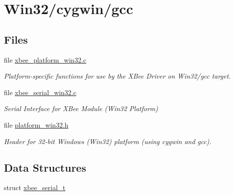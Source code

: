 \hypertarget{group__hal__win32}{\section{Win32/cygwin/gcc}
\label{group__hal__win32}
}
\subsection*{Files}
\begin{DoxyCompactItemize}
\item 
file \hyperlink{xbee__platform__win32_8c}{xbee\-\_\-platform\-\_\-win32.\-c}
\begin{DoxyCompactList}\small\item\em Platform-\/specific functions for use by the X\-Bee Driver on Win32/gcc target. \end{DoxyCompactList}\item 
file \hyperlink{xbee__serial__win32_8c}{xbee\-\_\-serial\-\_\-win32.\-c}
\begin{DoxyCompactList}\small\item\em Serial Interface for X\-Bee Module (Win32 Platform) \end{DoxyCompactList}\item 
file \hyperlink{platform__win32_8h}{platform\-\_\-win32.\-h}
\begin{DoxyCompactList}\small\item\em Header for 32-\/bit Windows (Win32) platform (using cygwin and gcc). \end{DoxyCompactList}\end{DoxyCompactItemize}
\subsection*{Data Structures}
\begin{DoxyCompactItemize}
\item 
struct \hyperlink{structxbee__serial__t}{xbee\-\_\-serial\-\_\-t}
\end{DoxyCompactItemize}
